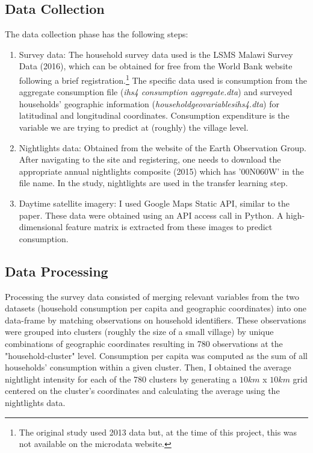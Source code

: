 \documentclass[11pt, a4paper, leqno]{article}
\begin{document}
\subsection{Data Collection}

 The data collection phase has the following steps: \vspace{-0.2cm}
\begin{enumerate}
	\item Survey data: The household survey data used is the LSMS Malawi Survey Data (2016), which can be obtained for free from the World Bank website following a brief registration.\footnote{The original study used 2013 data but, at the time of this project, this was not available on the microdata website.} The specific data used is consumption from the aggregate consumption file (\textit{ihs4 consumption aggregate.dta}) and surveyed households' geographic information (\textit{householdgeovariablesihs4.dta}) for latitudinal and longitudinal coordinates. Consumption expenditure is the variable we are trying to predict at (roughly) the village level.
	\item Nightlights data: Obtained from the website of the Earth Observation Group. After navigating to the site and registering, one needs to download the appropriate annual nightlights composite (2015) which has '00N060W' in the file name. In the study, nightlights are used in the transfer learning step.
	\item Daytime satellite imagery: I used Google Maps Static API, similar to the paper. These data were obtained using an API access call in Python. A high-dimensional feature matrix is extracted from these images to predict consumption.
\end{enumerate}

\subsection{Data Processing}

 Processing the survey data consisted of merging relevant variables from the two datasets (household consumption per capita and geographic coordinates) into one data-frame by matching observations on household identifiers. These observations were grouped into clusters (roughly the size of a small village) by unique combinations of geographic coordinates resulting in 780 observations at the "household-cluster" level. Consumption per capita was computed as the sum of all households' consumption within a given cluster. Then, I obtained the average nightlight intensity for each of the 780 clusters by generating a $10 km$ x $10 km$ grid centered on the cluster's coordinates and calculating the average using the nightlights data. 
\end{document}
